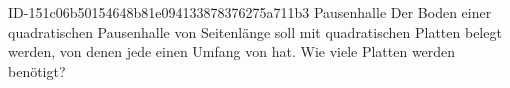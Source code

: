 \begin{exercise}
      {ID-151c06b50154648b81e094133878376275a711b3}
      {Pausenhalle}
  \ifproblem\problem
    Der Boden einer quadratischen Pausenhalle von  Seitenlänge soll
    mit quadratischen Platten belegt werden, von denen jede einen Umfang von
     hat. Wie viele Platten werden benötigt?
  \fi
\end{exercise}

